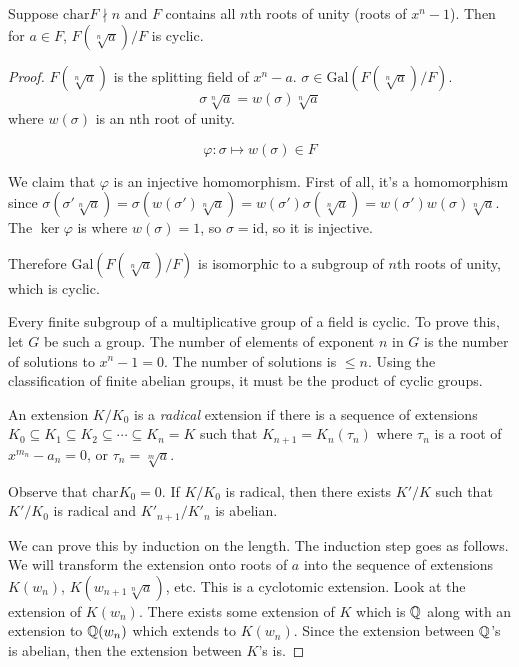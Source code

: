 \documentclass[a4paper,twoside,master.tex]{subfiles}
\begin{document}
\begin{claim}
    Suppose $ \text{char} F \nmid n $ and $ F $ contains all $ n $th roots of unity (roots of $ x^n - 1 $). Then for $ a \in F $, $ F(\sqrt[n]{a}) / F $ is cyclic.
\end{claim}
\begin{proof}
    $ F(\sqrt[n]{a}) $ is the splitting field of $ x^n - a $. $ \sigma \in \text{Gal}(F(\sqrt[n]{a}) / F) $.
    \begin{equation}
        \sigma \sqrt[n]{a} = w(\sigma) \sqrt[n]{a}
    \end{equation}
    where $ w(\sigma) $ is an nth root of unity.

    \begin{equation}
        \varphi \colon \sigma \mapsto w(\sigma) \in F
    \end{equation}
    
    We claim that $ \varphi $ is an injective homomorphism. First of all, it's a homomorphism since $ \sigma(\sigma' \sqrt[n]{a}) = \sigma(w(\sigma') \sqrt[n]{a}) = w(\sigma') \sigma(\sqrt[n]{a}) = w(\sigma') w(\sigma) \sqrt[n]{a} $. The $ \ker \varphi $ is where $ w(\sigma) = 1 $, so $ \sigma = \text{id} $, so it is injective.

    Therefore $ \text{Gal}(F(\sqrt[n]{a}) / F) $ is isomorphic to a subgroup of $ n $th roots of unity, which is cyclic.
    \begin{ex}
        Every finite subgroup of a multiplicative group of a field is cyclic. To prove this, let $ G $ be such a group. The number of elements of exponent $ n $ in $ G $ is the number of solutions to $ x^n - 1 = 0 $. The number of solutions is $ \leq n $. Using the classification of finite abelian groups, it must be the product of cyclic groups.
    \end{ex}
    \begin{definition}
        An extension $ K/K_0 $ is a \textit{radical} extension if there is a sequence of extensions $ K_0 \subseteq K_1 \subseteq K_2 \subseteq \cdots \subseteq K_n = K $ such that $ K_{n+1} = K_n(\tau_n) $ where $ \tau_n $ is a root of $ x^{m_n} - a_n = 0 $, or $ \tau_n = \sqrt[m]{a} $.
    \end{definition}
    Observe that $ \text{char} K_0 = 0 $. If $ K/K_0 $ is radical, then there exists $ K'/K $ such that $ K'/K_0 $ is radical and $ K'_{n+1} / K'_n $ is abelian.
    
    We can prove this by induction on the length. The induction step goes as follows. We will transform the extension onto roots of $ a $ into the sequence of extensions $ K(w_n) $, $ K(w_{n+1} \sqrt[n]{a}) $, etc. This is a cyclotomic extension. Look at the extension of $ K(w_n) $. There exists some extension of $ K $ which is $ \mathbb{Q} $ along with an extension to $ \mathbb{Q}(w_n) $ which extends to $ K(w_n) $. Since the extension between $ \mathbb{Q} $'s is abelian, then the extension between $ K $'s is.


\end{proof}
\end{document}
